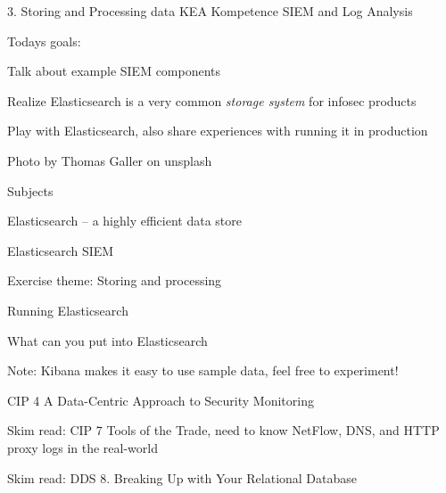 \documentclass[Screen16to9,17pt]{foils}
\begin{document}
\mytitlepage
{3. Storing and Processing data}
{KEA Kompetence SIEM and Log Analysis}




Todays goals:
\begin{list2}
\item Talk about example SIEM components
\item Realize Elasticsearch is a very common \emph{storage system} for infosec products
\item Play with Elasticsearch, also share experiences with running it in production
\end{list2}

Photo by Thomas Galler on unsplash


\begin{list1}
\item Subjects
\begin{list2}
\item Elasticsearch -- a highly efficient data store
\item Elasticsearch SIEM
\end{list2}
\item Exercise theme: Storing and processing
\begin{list2}
\item Running Elasticsearch
\item What can you put into Elasticsearch

\end{list2}
\end{list1}




Note: Kibana makes it easy to use sample data, feel free to experiment!



\begin{list1}
\item CIP 4 A Data-Centric Approach to Security Monitoring
\item Skim read: CIP 7 Tools of the Trade, need to know NetFlow, DNS, and HTTP proxy logs in the real-world
\item Skim read: DDS 8. Breaking Up with Your Relational Database
\end{list1}
\end{document}
